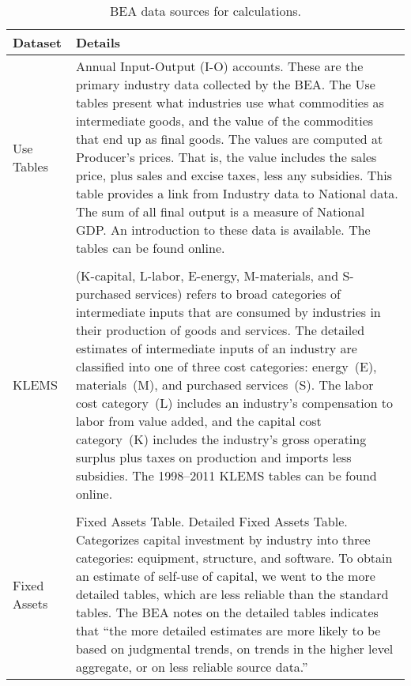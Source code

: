 \begin{table}
\caption[BEA data sources for calcuations]{BEA data sources for calculations.}
\begin{center}
  \begin{tabular}{l @{\hspace{2em}} p{10cm}}
   \toprule 
    Dataset & Details  \\ 

	\midrule
Use Tables & Annual Input-Output (I-O) accounts. 
	These are the primary industry data collected by the BEA.\@
	The Use tables present what industries use what commodities 
	as intermediate goods, and the value of the commodities that end up as final goods. 
	The values are computed at Producer’s prices. 
	That is, the value includes the sales price, plus sales and excise taxes, 
	less any subsidies. 
	This table provides a link from Industry data to National data. 
	The sum of all final output is a measure of National GDP.\@
	An introduction to these data is available.\cite{Streitwieser:2011aa}
	The tables can be found online.\cite{BEAIOData}\\
 &\\

KLEMS & (K-capital, L-labor, E-energy, M-materials, and S-purchased services) 
	refers to broad categories of intermediate inputs 
	that are consumed by industries in their production 
	of goods and services.\cite{Strassner:2005aa}
	The detailed estimates of intermediate inputs of an industry 
	are classified into one of three cost categories:
	energy~(E), materials~(M), and purchased services~(S).
	The labor cost category~(L) includes an industry’s compensation to labor from value added, 
	and the capital cost category~(K) includes the industry’s 
	gross operating surplus plus taxes on production and imports less subsidies.  
	The 1998--2011 KLEMS tables can be found online.\cite{BEAKLEMSData}\\
 & \\
Fixed Assets &  Fixed Assets Table. Detailed Fixed Assets Table. 
	Categorizes capital investment by industry into three categories:
	equipment, structure, and software. 
	To obtain an estimate of self-use of capital, 
	we went to the more detailed tables, 
	which are less reliable than the standard tables. 
	The BEA notes on the detailed tables indicates that 
	``the more detailed estimates are more likely to be based on judgmental trends, 
	on trends in the higher level aggregate, 
	or on less reliable source data.''~\cite[Table~2.5]{BEADetailedData}\\
    \bottomrule
  \end{tabular}

\end{center}
\label{tab:data_definitions}
\end{table}

